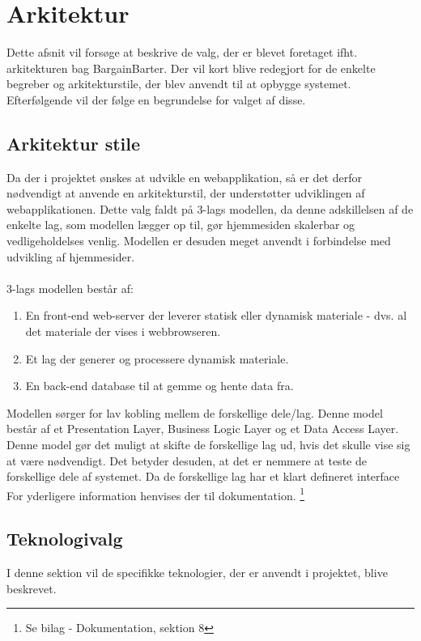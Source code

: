 \chapter{Arkitektur}
Dette afsnit vil forsøge at beskrive de valg, der er blevet foretaget ifht. arkitekturen bag BargainBarter. Der vil kort blive redegjort for de enkelte begreber og arkitekturstile, der blev anvendt til at opbygge systemet. Efterfølgende vil der følge en begrundelse for valget af disse.

\section{Arkitektur stile}
Da der i projektet ønskes at udvikle en webapplikation, så er det derfor nødvendigt at anvende en arkitekturstil, der understøtter udviklingen af webapplikationen.
Dette valg faldt på 3-lags modellen, da denne adskillelsen af de enkelte lag, som modellen lægger op til, gør hjemmesiden skalerbar og vedligeholdelses venlig. Modellen er desuden meget anvendt i forbindelse med udvikling af hjemmesider.\\ \\ 3-lags modellen består af:
\begin{enumerate}
	\item En front-end web-server der leverer statisk eller dynamisk materiale - dvs. al det materiale der vises i webbrowseren.
	\item Et lag der generer og processere dynamisk materiale.
	\item En back-end database til at gemme og hente data fra.
\end{enumerate}

Modellen sørger for lav kobling mellem de forskellige dele/lag. Denne model består af et Presentation Layer, Business Logic Layer og et Data Access Layer. Denne model gør det muligt at skifte de forskellige lag ud, hvis det skulle vise sig at være nødvendigt. Det betyder desuden, at det er nemmere at teste de forskellige dele af systemet. Da de forskellige lag har et klart defineret interface \\
For yderligere information henvises der til dokumentation. \footnote{Se bilag - Dokumentation, sektion 8}

\section{Teknologivalg}
I denne sektion vil de specifikke teknologier, der er anvendt i projektet, blive beskrevet.

